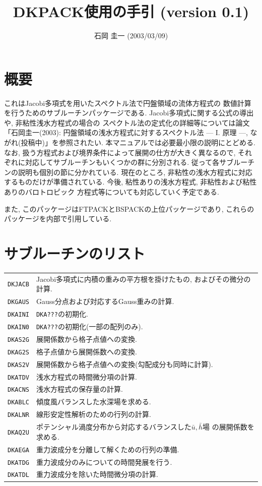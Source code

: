 \documentclass[a4j,fleqn]{jarticle}
\title{DKPACK使用の手引 (version 0.1)}
\author{石岡 圭一  (2003/03/09)}
\date{}
\begin{document}
\maketitle

\section{概要}

これはJacobi多項式を用いたスペクトル法で円盤領域の流体方程式の
数値計算を行うためのサブルーチンパッケージである.
Jacobi多項式に関する公式の導出や, 非粘性浅水方程式の場合の
スペクトル法の定式化の詳細等については論文
「石岡圭一(2003): 円盤領域の浅水方程式に対するスペクトル法 
   --- I. 原理 ---, ながれ(投稿中)」を参照されたい.
本マニュアルでは必要最小限の説明にとどめる.
なお, 扱う方程式および境界条件によって展開の仕方が大きく異なるので,
それぞれに対応してサブルーチンもいくつかの群に分別される.
従って各サブルーチンの説明も個別の節に分かれている.
現在のところ, 非粘性の浅水方程式に対応するものだけが準備されている.
今後, 粘性ありの浅水方程式, 非粘性および粘性ありのバロトロピック
方程式等についても対応していく予定である.

また, このパッケージはFTPACKとBSPACKの上位パッケージであり, これらの
パッケージを内部で引用している.

\section{サブルーチンのリスト}

\vspace{1em}
\begin{tabular}{ll}
{\tt DKJACB} & Jacobi多項式に内積の重みの平方根を掛けたもの,
               およびその微分の計算.\\
{\tt DKGAUS} & Gauss分点および対応するGauss重みの計算.\\\hline
{\tt DKAINI} & {\tt DKA???}の初期化.\\
{\tt DKAIN0} & {\tt DKA???}の初期化(一部の配列のみ).\\
{\tt DKAS2G} & 展開係数から格子点値への変換.\\
{\tt DKAG2S} & 格子点値から展開係数への変換.\\
{\tt DKAS2V} & 展開係数から格子点値への変換(勾配成分も同時に計算).\\
{\tt DKATDV} & 浅水方程式の時間微分項の計算.\\
{\tt DKACNS} & 浅水方程式の保存量の計算.\\
{\tt DKABLC} & 傾度風バランスした水深場を求める.\\
{\tt DKALNR} & 線形安定性解析のための行列の計算.\\
{\tt DKAQ2U} & ポテンシャル渦度分布から対応するバランスした$\bar u,\bar h$場
の展開係数を求める.\\
{\tt DKAEGA} & 重力波成分を分離して解くための行列の準備.\\
{\tt DKATDG} & 重力波成分のみについての時間発展を行う.\\
{\tt DKATDL} & 重力波成分を除いた時間微分項の計算.
\end{tabular}
\end{document}
